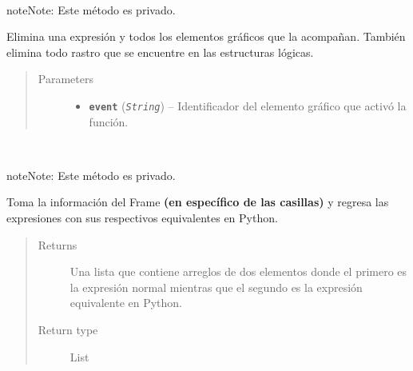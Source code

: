 \documentclass[class=report, crop=false]{standalone}
\begin{document}
\begin{fulllineitems}
\begin{fulllineitems}
\end{fulllineitems}

\begin{fulllineitems}

~

\begin{notice}{note}{Note:}
Este método es privado.
\end{notice}

Elimina una expresión y todos los elementos 
gráficos que la acompañan.\break
También elimina todo rastro que se encuentre 
en las estructuras lógicas.

\begin{quote}\begin{description}
\item[{Parameters}] \leavevmode\begin{itemize}
\item \textbf{\texttt{event}} (\emph{\texttt{String}}) -- Identificador del elemento gráfico que activó la función.
\end{itemize}
\end{description}\end{quote}

\end{fulllineitems}

\begin{fulllineitems}

~

\begin{notice}{note}{Note:}
Este método es privado.
\end{notice}

Toma la información del Frame \textbf{(en específico de las casillas)} 
y regresa las expresiones con sus respectivos equivalentes en Python.

\begin{quote}\begin{description}
\item[{Returns}] \leavevmode
Una lista que contiene arreglos de dos elementos donde el primero es la expresión normal mientras que el segundo es la expresión equivalente en Python.
\item[{Return type}] \leavevmode
List
\end{description}\end{quote}


\end{fulllineitems}
\end{fulllineitems}
\end{document}
